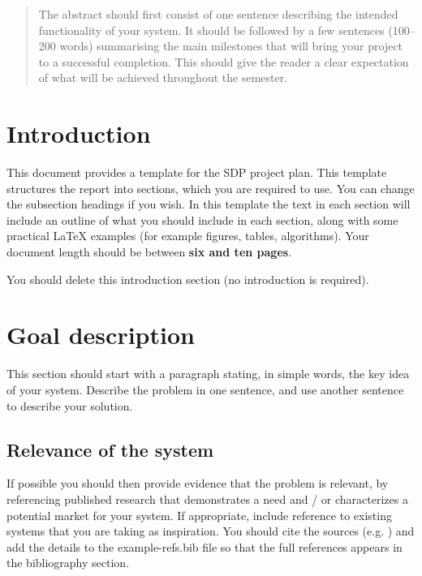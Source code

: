 \documentclass{article}
\begin{document}
 



\begin{abstract} 
The abstract should first consist of one sentence describing the intended functionality of your system. It should be followed by a few sentences (100--200 words) summarising the main milestones that will bring your project to a successful completion. This should give the reader a clear expectation of what will be achieved throughout the semester.
\end{abstract} 

\section*{Introduction}
\label{sec:intro}
This document provides a template for the SDP project plan.  This template structures the report into sections, which you are required to use. You can change the subsection headings if you wish. In this template the text in each section will include an outline of what you should include in each section, along with some practical LaTeX examples (for example figures, tables, algorithms).  Your document length should be between \textbf{six and ten pages}. 

 You should delete this introduction section (no introduction is required).

\section{Goal description} 
This section should start with a paragraph stating, in simple words, the key idea of your system. Describe the problem in one sentence, and use another sentence to describe your solution.

\subsection{Relevance of the system} 
If possible you should then provide evidence that the problem is relevant, by referencing published research that demonstrates a need and / or characterizes a potential market for your system. If appropriate, include reference to existing systems that you are taking as inspiration. You should cite the sources (e.g. \cite{Newell81}) and add the details to the example-refs.bib file so that the full references appears in the bibliography section.
\end{document}

